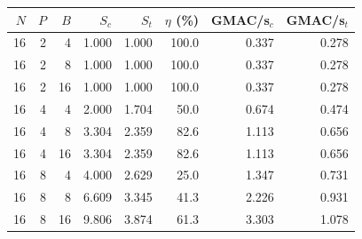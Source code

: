 \begin{tabular}{rrrrrrrr}
\toprule
$N$ & $P$ & $B$ & $S_c$ & $S_t$ & $\eta$ (\%) & GMAC/s$_c$ & GMAC/s$_t$\\
\midrule
16 & 2 & 4 & 1.000 & 1.000 & 100.0 & 0.337 & 0.278\\
16 & 2 & 8 & 1.000 & 1.000 & 100.0 & 0.337 & 0.278\\
16 & 2 & 16 & 1.000 & 1.000 & 100.0 & 0.337 & 0.278\\
16 & 4 & 4 & 2.000 & 1.704 & 50.0 & 0.674 & 0.474\\
16 & 4 & 8 & 3.304 & 2.359 & 82.6 & 1.113 & 0.656\\
16 & 4 & 16 & 3.304 & 2.359 & 82.6 & 1.113 & 0.656\\
16 & 8 & 4 & 4.000 & 2.629 & 25.0 & 1.347 & 0.731\\
16 & 8 & 8 & 6.609 & 3.345 & 41.3 & 2.226 & 0.931\\
16 & 8 & 16 & 9.806 & 3.874 & 61.3 & 3.303 & 1.078\\
\bottomrule
\end{tabular}
